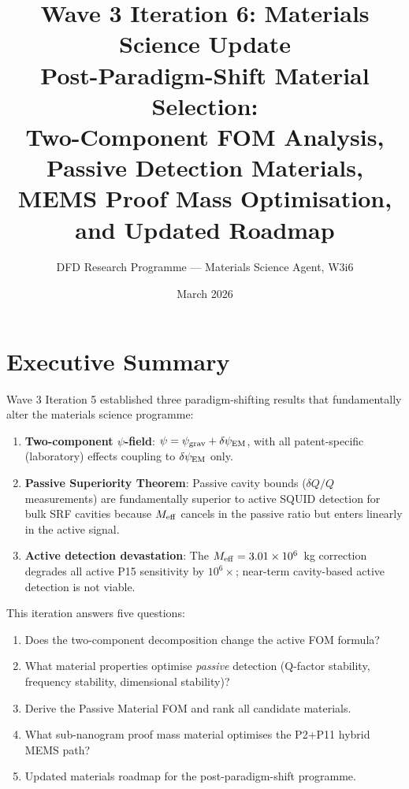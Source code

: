 \documentclass[11pt]{article}
\title{Wave 3 Iteration 6: Materials Science Update\\
\large Post-Paradigm-Shift Material Selection:\\
Two-Component FOM Analysis, Passive Detection Materials,\\
MEMS Proof Mass Optimisation, and Updated Roadmap}
\author{DFD Research Programme --- Materials Science Agent, W3i6}
\date{March 2026}
\theoremstyle{definition}
\theoremstyle{remark}
\newcommand{\ee}[1]{\times 10^{#1}}
\newcommand{\Meff}{M_{\rm eff}}
\newcommand{\psigrav}{\psi_{\rm grav}}
\newcommand{\psiEM}{\delta\psi_{\rm EM}}
\begin{document}
\maketitle
\tableofcontents
\newpage

\section{Executive Summary}
\label{sec:executive}

Wave 3 Iteration 5 established three paradigm-shifting results that
fundamentally alter the materials science programme:

\begin{enumerate}[nosep]
  \item \textbf{Two-component $\psi$-field}: $\psi = \psigrav + \psiEM$,
    with all patent-specific (laboratory) effects coupling to
    $\psiEM$ only.
  \item \textbf{Passive Superiority Theorem}: Passive cavity bounds
    ($\delta Q/Q$ measurements) are fundamentally superior to active
    SQUID detection for bulk SRF cavities because $\Meff$ cancels
    in the passive ratio but enters linearly in the active signal.
  \item \textbf{Active detection devastation}: The $\Meff = 3.01\ee{6}$~kg
    correction degrades all active P15 sensitivity by $10^6\times$;
    near-term cavity-based active detection is not viable.
\end{enumerate}

\noindent This iteration answers five questions:

\begin{tcolorbox}[colback=blue!5!white, colframe=blue!50!black,
  title=\textbf{W3i6 Materials Science Mandate}]
\begin{enumerate}[nosep]
  \item Does the two-component decomposition change the active FOM formula?
  \item What material properties optimise \emph{passive} detection
    (Q-factor stability, frequency stability, dimensional stability)?
  \item Derive the Passive Material FOM and rank all candidate materials.
  \item What sub-nanogram proof mass material optimises the P2+P11
    hybrid MEMS path?
  \item Updated materials roadmap for the post-paradigm-shift programme.
\end{enumerate}
\end{tcolorbox}
\end{document}
